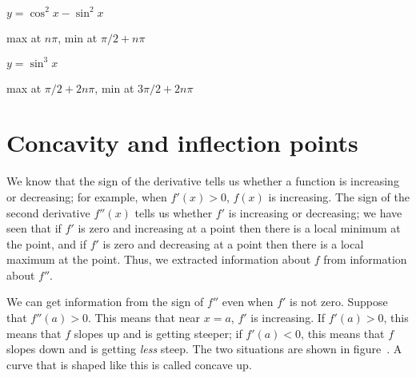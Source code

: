 \begin{exercises}
\begin{exercise} $y =\cos^2 x - \sin^2 x$
\begin{answer} max at $n\pi$, min at $\pi/2+n\pi$
\end{answer}\end{exercise}

\begin{exercise} $y = \sin^3 x$
\begin{answer} max at $\pi/2+2n\pi$, min at $3\pi/2+2n\pi$
\end{answer}\end{exercise}

\endtwocol
\end{exercises}

\section{Concavity and inflection points} {}{}
\nobreak
We know that the sign of the derivative tells us whether a function is
increasing or decreasing; for example, when $f'(x)>0$,
$f(x)$ is increasing. The sign of the second derivative
$f''(x)$ tells us whether $f'$ is increasing or decreasing; we have
seen that if $f'$ is zero and increasing at a point then there is a
local minimum at the point, and if $f'$ is zero and decreasing at a
point then there is a local maximum at the point. Thus, we extracted
information about $f$ from information about $f''$. 

We can get information from the sign of $f''$ even when $f'$ is not
zero. Suppose that $f''(a)>0$. This means that near $x=a$, $f'$ is
increasing. If $f'(a)>0$, this means that $f$ slopes up and is getting
steeper; if $f'(a)<0$, this means that $f$ slopes down and is getting
{\it less\/} steep. The two situations are shown in
figure~. A curve that is shaped like this is
called {\dfont concave up.}


